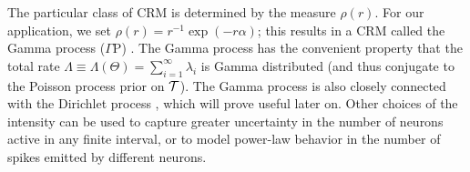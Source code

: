 The particular class of CRM is determined by the \Levy measure $\rho(r)$. For our application, we set $\rho(r) = r^{-1}\exp(-r\alpha)$;
this results in a CRM called the Gamma process ($\Gamma$P) \citep{applebaum2004}. 
The Gamma process has the convenient property that the 
total rate $\Lambda \equiv \Lambda(\Theta) = \sum_{i=1}^{\infty} \lambda_i$ is Gamma distributed (and thus conjugate to the Poisson process prior on $\mathcal{T}$).
The Gamma process is also closely connected with the Dirichlet process \citep{Ferguson73}, which will prove useful
later on.
Other choices of the \Levy intensity can be used to capture greater uncertainty in the number of neurons active in any finite interval, or to model
power-law behavior in the number of spikes emitted by different neurons.

